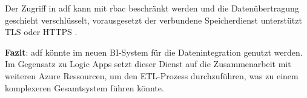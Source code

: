Der Zugriff in \ac{adf} kann mit \ac{rbac} beschränkt werden \cite{sabat_security_2021} und die Datenübertragung geschieht verschlüsselt, vorausgesetzt der verbundene Speicherdienst unterstützt TLS oder HTTPS \cite{baldwin_azure_adf_2021}.

\textbf{Fazit}: \ac{adf} könnte im neuen BI-System für die Datenintegration genutzt werden. Im Gegensatz zu Logic Apps setzt dieser Dienst auf die Zusammenarbeit mit weiteren Azure Ressourcen, um den ETL-Prozess durchzuführen, was zu einem komplexeren Gesamtsystem führen könnte.





